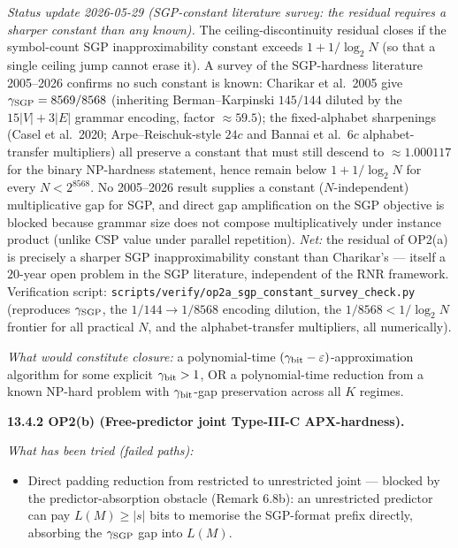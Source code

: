 \documentclass[
]{article}
\begin{document}
\emph{Status update 2026-05-29 (SGP-constant literature survey:
the residual requires a sharper constant than any known).} The
ceiling-discontinuity residual closes if the symbol-count SGP
inapproximability constant exceeds $1 + 1/\log_2 N$ (so that a single
ceiling jump cannot erase it). A survey of the SGP-hardness literature
2005--2026 confirms no such constant is known: Charikar et al.\ 2005
give $\gamma_{\rm SGP} = 8569/8568$ (inheriting Berman--Karpinski
$145/144$ diluted by the $15|V|+3|E|$ grammar encoding, factor
$\approx 59.5$); the fixed-alphabet sharpenings (Casel et al.\ 2020;
Arpe--Reischuk-style $24c$ and Bannai et al.\ $6c$ alphabet-transfer
multipliers) all preserve a constant that must still descend to
$\approx 1.000117$ for the binary NP-hardness statement, hence remain
below $1 + 1/\log_2 N$ for every $N < 2^{8568}$. No 2005--2026 result
supplies a constant ($N$-independent) multiplicative gap for SGP, and
direct gap amplification on the SGP objective is blocked because
grammar size does not compose multiplicatively under instance product
(unlike CSP value under parallel repetition). \emph{Net:} the residual
of OP2(a) is precisely a sharper SGP inapproximability constant than
Charikar's --- itself a $20$-year open problem in the SGP literature,
independent of the RNR framework. Verification script:
\texttt{scripts/verify/op2a\_sgp\_constant\_survey\_check.py}
(reproduces $\gamma_{\rm SGP}$, the $1/144 \to 1/8568$ encoding
dilution, the $1/8568 < 1/\log_2 N$ frontier for all practical $N$,
and the alphabet-transfer multipliers, all numerically).

\emph{What would constitute closure:} a polynomial-time
$(\gamma_{\rm bit} - \varepsilon)$-approximation algorithm for some
explicit $\gamma_{\rm bit} > 1$, OR a polynomial-time reduction
from a known NP-hard problem with $\gamma_{\rm bit}$-gap preservation
across all $K$ regimes.

\textbf{13.4.2 OP2(b) (Free-predictor joint Type-III-C APX-hardness).}

\emph{What has been tried (failed paths):}
\begin{itemize}
\item Direct padding reduction from restricted to unrestricted
joint --- blocked by the predictor-absorption obstacle (Remark 6.8b):
an unrestricted predictor can pay $L(M) \geq |s|$ bits to memorise
the SGP-format prefix directly, absorbing the $\gamma_{\rm SGP}$
gap into $L(M)$.
\end{itemize}
\end{document}
